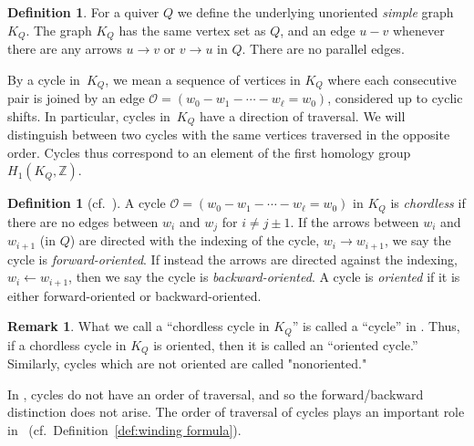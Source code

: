 \documentclass[11pt, letterpaper]{amsart}
\newcommand{\comment}[1]{{\noindent\textsf{\color{blue}
$\clubsuit$~#1~$\clubsuit$}}}
\newcommand{\hide}[1]{}
\theoremstyle{definition}
\newtheorem{remark}[theorem]{Remark}
\newtheorem{definition}[theorem]{Definition}
\numberwithin{equation}{section}
\def\ZZ{{\mathbb Z}}
\begin{document}

\begin{definition}
\label{def:underlying unoriented graph}
For a quiver $Q$ we define the underlying unoriented \emph{simple} graph~$K_Q$.
The graph $K_Q$ has the same vertex set as $Q$, and an edge $u - v$ whenever there are any arrows $u \rightarrow v$ or $v \rightarrow u$ in $Q$.
There are no parallel edges.

By a cycle in~$K_Q$, we mean a sequence of vertices in $K_Q$ where each consecutive pair is joined by an edge $\mathcal O = (w_0 - w_1 - \cdots - w_\ell=w_0)$, considered up to cyclic shifts.
In particular, cycles in~$K_Q$ have a direction of traversal. 
We will distinguish between two cycles with the same vertices traversed in the opposite order.
Cycles thus correspond to an element of the first homology group~$H_1(K_Q, \ZZ)$.
\end{definition}
\pagebreak[2]

\begin{definition}[{cf.\ \cite[Definition 2.10]{COQ}}]
\label{def:undirectedCycle}
A cycle $\mathcal O = (w_0 - w_1 - \cdots - w_\ell=w_0)$ in $K_Q$ is \emph{chordless} if there are no edges between $w_i$ and $w_{j}$ for $i \neq j \pm 1$.
If the arrows between $w_i$ and $w_{i+1}$ (in $Q$) are directed with the indexing of the cycle, $w_i \rightarrow w_{i+1}$, we say the cycle is \emph{forward-oriented}.
If instead the arrows are directed against the indexing, $w_i \leftarrow w_{i+1}$, then we say the cycle is \emph{backward-oriented}.
A cycle is \emph{oriented} if it is either forward-oriented or backward-oriented.

\hide{
While the cycle $\mathcal O$ lives in the unoriented simple graph $K_Q$, each edge in the cycle corresponds to one or more arrows in $Q$.
When the orientation of some (or all) of the arrows is known, we may replace the dashes ``$-$'' with ``$\rightarrow$'' or ``$\leftarrow$'' accordingly.
Thus if $\mathcal O$ is forward-oriented, then it could be denoted $(w_0 \rightarrow w_1 \rightarrow \cdots \rightarrow w_\ell = w_0)$.
}
\end{definition}

\begin{remark}
\label{rem:cycle terminology}
What we call a ``chordless cycle in $K_Q$'' is called a ``cycle'' in \cite{SevenAMatrices}. 
Thus, if a chordless cycle in $K_Q$ is oriented, then it is called an ``oriented cycle.'' 
Similarly, cycles which are not oriented are called "nonoriented." %

In \cite{SevenAMatrices}, cycles do not have an order of traversal, and so the forward/backward distinction does not arise.
The order of traversal of cycles plays an important role in~\cite{COQ} (cf.\ Definition~\ref{def:winding formula}).
\end{remark}
\end{document}
